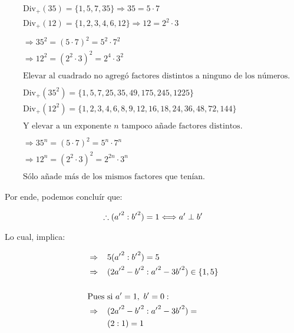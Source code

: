 \documentclass{article}
\begin{document}
\begin{align*}
    &\text{Div}_{+}(35) = \{1, 5, 7, 35\} \Rightarrow 35 = 5 \cdot 7 \\
    &\text{Div}_{+}(12) = \{1, 2, 3, 4, 6, 12\} \Rightarrow 12 = 2^2 \cdot 3
    \\ \\
    &\Rightarrow 35^2 = (5 \cdot 7)^2 = 5^2 \cdot 7^2 \\
    &\Rightarrow 12^2 = (2^2 \cdot 3)^2 = 2^4 \cdot 3^2
    \\ \\
    &\text{Elevar al cuadrado no agregó factores distintos a ninguno de los números.}
    \\ \\
    &\text{Div}_{+}(35^2) = \{1, 5, 7, 25, 35, 49, 175, 245, 1225\} \\
    &\text{Div}_{+}(12^2) = \{1, 2, 3, 4, 6, 8, 9, 12, 16, 18, 24, 36, 48, 72, 144\}
    \\ \\
    &\text{Y elevar a un exponente }\textit{n}\text{ tampoco añade factores distintos.}
    \\ \\
    &\Rightarrow 35^n = (5 \cdot 7)^2 = 5^n \cdot 7^n \\
    &\Rightarrow 12^n = (2^2 \cdot 3)^2 = 2^{2n} \cdot 3^n
    \\ \\
    &\text{Sólo añade más de los mismos factores que tenían.}
\end{align*}


Por ende, podemos concluír que:

\begin{align*}
    \therefore ({a'}^2 : {b'}^2) = 1 \Longleftrightarrow {a'} \hspace{1mm} \bot \hspace{1mm} {b'}
\end{align*}

Lo cual, implica:

\begin{align*}
    &\Rightarrow \hspace{3mm} 5 ({a'}^2 : {b'}^2) = 5 \\
    &\Rightarrow \hspace{3mm} (2 {a'}^2 - {b'}^2 : {a'}^2 - 3{b'}^2) \in \{1,5\} \\
    \\
    &\text{Pues si } a'=1, \text{ } b'=0: \\
    &\Rightarrow \hspace{3mm} (2 {a'}^2 - {b'}^2 : {a'}^2 - 3{b'}^2) = \\
    &\hspace{8.5mm} (2 : 1) = 1 \\
\end{align*}
\end{document}
